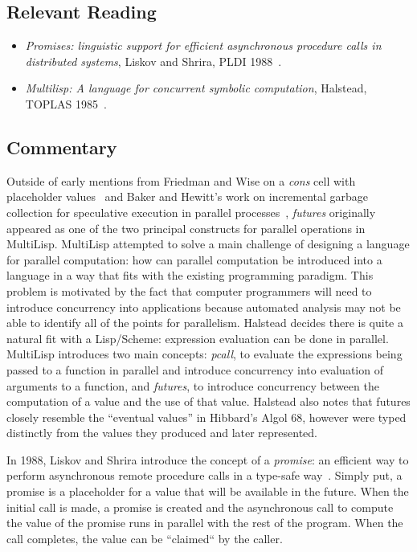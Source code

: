 \subsection{Relevant Reading}

\begin{itemize}
	\item \textit{Promises: linguistic support for efficient asynchronous procedure calls in distributed systems}, Liskov and Shrira, PLDI 1988~\cite{liskov1988promises}.
	\item \textit{Multilisp: A language for concurrent symbolic computation}, Halstead, TOPLAS 1985~\cite{halstead1985multilisp}.
\end{itemize}

\subsection{Commentary}

Outside of early mentions from Friedman and Wise on a \textit{cons} cell with placeholder values~\cite{1675100} and Baker and Hewitt's work on incremental garbage collection for speculative execution in parallel processes~\cite{Baker:1977:IGC:872734.806932}, \textit{futures} originally appeared as one of the two principal constructs for parallel operations in MultiLisp.  MultiLisp attempted to solve a main challenge of designing a language for parallel computation: how can parallel computation be introduced into a language in a way that fits with the existing programming paradigm.  This problem is motivated by the fact that computer programmers will need to introduce concurrency into applications because automated analysis may not be able to identify all of the points for parallelism.  Halstead decides there is quite a natural fit with a Lisp/Scheme: expression evaluation can be done in parallel.  MultiLisp introduces two main concepts: \textit{pcall}, to evaluate the expressions being passed to a function in parallel and introduce concurrency into evaluation of arguments to a function, and \textit{futures}, to introduce concurrency between the computation of a value and the use of that value.  Halstead also notes that futures closely resemble the ``eventual values'' in Hibbard's Algol 68, however were typed distinctly from the values they produced and later represented.~\cite{halstead1985multilisp}

In 1988, Liskov and Shrira introduce the concept of a \textit{promise}: an efficient way to perform asynchronous remote procedure calls in a type-safe way~\cite{liskov1988promises}.  Simply put, a promise is a placeholder for a value that will be available in the future.  When the initial call is made, a promise is created and the asynchronous call to compute the value of the promise runs in parallel with the rest of the program.  When the call completes, the value can be ``claimed`` by the caller.


